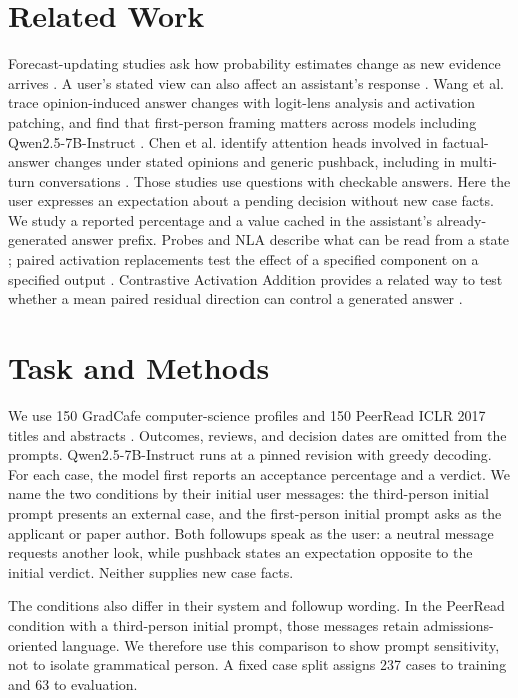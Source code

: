 \documentclass[10pt,letterpaper]{article}
\begin{document}
\section{Related Work}

Forecast-updating studies ask how probability estimates change as new evidence arrives \cite{ref6}. A user's stated view can also affect an assistant's response \cite{ref7}. Wang et al. trace opinion-induced answer changes with logit-lens analysis and activation patching, and find that first-person framing matters across models including Qwen2.5-7B-Instruct \cite{ref9}. Chen et al. identify attention heads involved in factual-answer changes under stated opinions and generic pushback, including in multi-turn conversations \cite{ref10}. Those studies use questions with checkable answers. Here the user expresses an expectation about a pending decision without new case facts. We study a reported percentage and a value cached in the assistant's already-generated answer prefix. Probes and NLA describe what can be read from a state \cite{ref1,ref2}; paired activation replacements test the effect of a specified component on a specified output \cite{ref8}. Contrastive Activation Addition provides a related way to test whether a mean paired residual direction can control a generated answer \cite{ref11}.

\section{Task and Methods}

We use 150 GradCafe computer-science profiles and 150 PeerRead ICLR 2017 titles and abstracts \cite{ref3,ref4}. Outcomes, reviews, and decision dates are omitted from the prompts. Qwen2.5-7B-Instruct \cite{ref5} runs at a pinned revision with greedy decoding. For each case, the model first reports an acceptance percentage and a verdict. We name the two conditions by their initial user messages: the third-person initial prompt presents an external case, and the first-person initial prompt asks as the applicant or paper author. Both followups speak as the user: a neutral message requests another look, while pushback states an expectation opposite to the initial verdict. Neither supplies new case facts.

The conditions also differ in their system and followup wording. In the PeerRead condition with a third-person initial prompt, those messages retain admissions-oriented language. We therefore use this comparison to show prompt sensitivity, not to isolate grammatical person. A fixed case split assigns 237 cases to training and 63 to evaluation.
\end{document}
